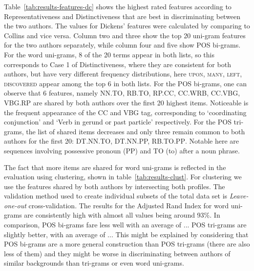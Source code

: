 \documentclass[a4paper,10pt,twoside,fleqn]{article}
\begin{document}
Table~\ref{tab:results-features-dc} shows the highest rated features 
according to Representativeness and Distinctiveness that are best 
in discriminating between the two authors. The values for Dickens' features 
were calculated by comparing to Collins and vice versa. 
Column two and three show the top 20 uni-gram features for the two authors
separately, while column four and five show POS bi-grams. 
For the word uni-grams, 8 of the 20 terms appear in both lists, so this corresponds
to Case 1 of Distinctiveness, where they are consistent for both authors, but
have very different frequency distributions, here \textsc{upon, many, left, discovered}
appear among the top 6 in both lists. 
For the POS bi-grams, one can observe that  6 features, namely
\textsc{NN.TO, RB.TO, RP.CC, CC.WRB, CC.VBG, VBG.RP} 
are shared by both authors over the first 20 highest items. 
Noticeable is the frequent appearance of the CC and VBG tag, 
corresponding to `coordinating conjunction' and `Verb in gerund or
past particle' respectively. 
For the POS tri-grams, the list of shared items decreases and only three remain 
common to both authors for the first 20: \textsc{DT.NN.TO,  DT.NN.PP, RB.TO.PP}.
Notable here are sequences involving possessive pronoun (PP) and TO (to) after 
a noun phrase. 

The fact that more items are shared for word uni-grams is reflected in the evaluation using 
clustering, shown in table~\ref{tab:results-clust}.
For clustering we use the features shared by both authors by intersecting both profiles. 
The validation method used to create individual subsets of the total data set 
is \emph{Leave-one-out} cross-validation. 
The results for the Adjusted Rand Index for word uni-grams are consistently high with 
almost all values being around 93\%. In comparison, POS bi-grams fare less well
with an average of ...
POS tri-grams are slightly better, with an average of ...
This might be explained by considering that POS bi-grams are a more general 
construction than POS tri-grams (there are also less of them) and they might
be worse in discriminating between authors of similar backgrounds 
than tri-grams or even word uni-grams. 
\end{document}
